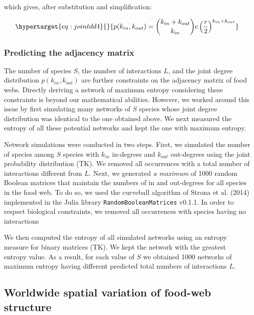 \documentclass[11pt]{article}
\begin{document}
which gives, after substitution and simplification:

\begin{equation}\protect\hypertarget{eq:jointdd4}{}{p(k_{in},k_{out}) = {k_{in}+k_{out}\choose k_{in}}c \left(\frac{r}{2}\right)^{k_{in}+k_{out}}}\label{eq:jointdd4}\end{equation}

\hypertarget{predicting-the-adjacency-matrix}{%
\subsubsection{Predicting the adjacency
matrix}\label{predicting-the-adjacency-matrix}}

The number of species \(S\), the number of interactions \(L\), and the
joint degree distribution \(p(k_{in},k_{out})\) are further constraints
on the adjacency matrix of food webs. Directly deriving a network of
maximum entropy considering these constraints is beyond our mathematical
abilities. However, we worked around this issue by first simulating many
networks of \(S\) species whose joint degree distribution was identical
to the one obtained above. We next measured the entropy of all these
potential networks and kept the one with maximum entropy.

Network simulations were conducted in two steps. First, we simulated the
number of species among \(S\) species with \(k_{in}\) in-degrees and
\(k_{out}\) out-degrees using the joint probability distribution (TK).
We removed all occurrences with a total number of interactions different
from \(L\). Next, we generated \emph{a maximum} of 1000 random Boolean
matrices that maintain the numbers of in and out-degrees for all species
in the food web. To do so, we used the curveball algorithm of Strona et
al. (2014) implemented in the Julia library
\texttt{RandomBooleanMatrices} v0.1.1. In order to respect biological
constraints, we removed all occurrences with species having no
interactions

We then computed the entropy of all simulated networks using an entropy
measure for binary matrices (TK). We kept the network with the greatest
entropy value. As a result, for each value of \(S\) we obtained 1000
networks of maximum entropy having different predicted total numbers of
interactions \(L\).

\hypertarget{worldwide-spatial-variation-of-food-web-structure}{%
\subsection{Worldwide spatial variation of food-web
structure}\label{worldwide-spatial-variation-of-food-web-structure}}
\end{document}
